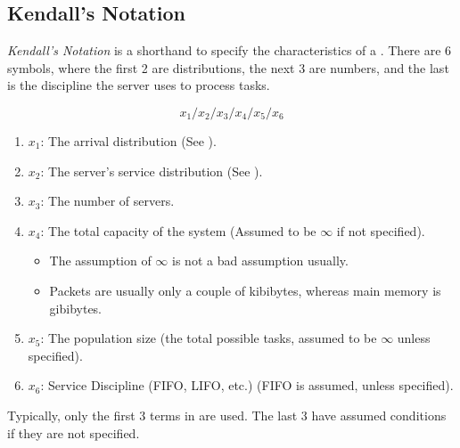 \subsection{Kendall's Notation}\label{subsec:Kendalls_Notation}
\begin{definition}\label{def:Kendalls_Notation}
  \emph{Kendall's Notation} is a shorthand to specify the characteristics of a .
  There are 6 symbols, where the first 2 are distributions, the next 3 are numbers, and the last is the discipline the server uses to process tasks.

  \begin{equation}\label{eq:Kendalls_Notation}
    x_{1}/x_{2}/x_{3}/x_{4}/x_{5}/x_{6}
  \end{equation}
  \begin{enumerate}[noitemsep]
  \item $x_{1}$: The arrival distribution (See ).
  \item $x_{2}$: The server's service distribution (See ).
  \item $x_{3}$: The number of servers.
  \item $x_{4}$: The total capacity of the system (Assumed to be $\infty$ if not specified).
    \begin{itemize}[noitemsep]
    \item The assumption of $\infty$ is not a bad assumption usually.
    \item Packets are usually only a couple of kibibytes, whereas main memory is gibibytes.
    \end{itemize}
  \item $x_{5}$: The population size (the total possible tasks, assumed to be $\infty$ unless specified).
  \item $x_{6}$: Service Discipline (FIFO, LIFO, etc.) (FIFO is assumed, unless specified).
  \end{enumerate}

  \begin{remark}\label{rmk:Short_Kendalls_Notation}
    Typically, only the first 3 terms in  are used.
    The last 3 have assumed conditions if they are not specified.
  \end{remark}
\end{definition}

